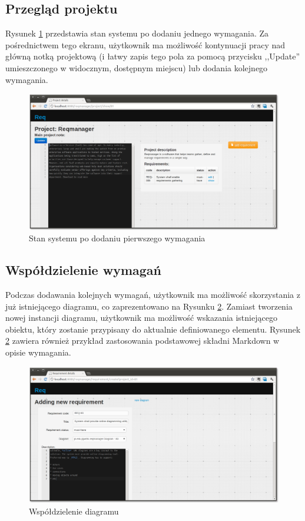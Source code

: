     \subsection{Przegląd projektu}

      Rysunek \ref{fig:afterAddReq} przedstawia stan systemu po dodaniu jednego wymagania. Za pośrednictwem tego ekranu, użytkownik ma możliwość kontynuacji pracy nad główną notką projektową (i łatwy zapis tego pola za pomocą przycisku ,,Update'' umieszczonego w widocznym, dostępnym miejscu) lub dodania kolejnego wymagania.

      \begin{figure}[t]
        \centering
        \includegraphics[width=1.0\textwidth]{img/tut_4.png}
        \caption{Stan systemu po dodaniu pierwszego wymagania}
        \label{fig:afterAddReq}
      \end{figure}
      
    \subsection{Współdzielenie wymagań}

      Podczas dodawania kolejnych wymagań, użytkownik ma możliwość skorzystania z już istniejącego diagramu, co zaprezentowano na Rysunku \ref{fig:diagReuse}. Zamiast tworzenia nowej instancji diagramu, użytkownik ma możliwość wskazania istniejącego obiektu, który zostanie przypisany do aktualnie definiowanego elementu. Rysunek \ref{fig:diagReuse} zawiera również przykład zastosowania podstawowej składni Markdown w opisie wymagania.

      \begin{figure}[t]
        \centering
        \includegraphics[width=1.0\textwidth]{img/tut_8.png}
        \caption{Współdzielenie diagramu}
        \label{fig:diagReuse}
      \end{figure}


